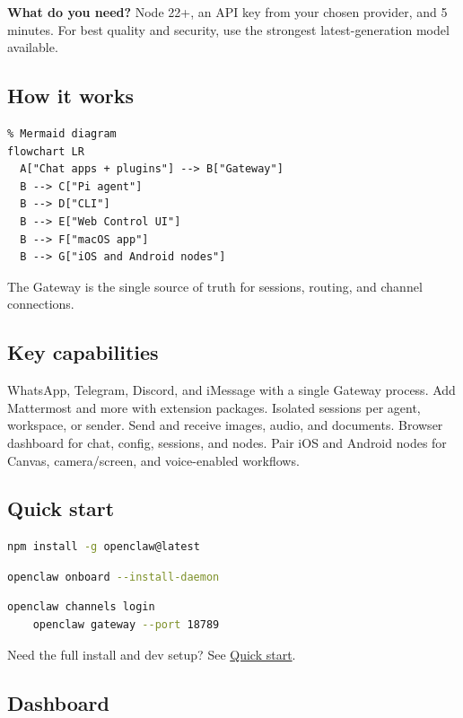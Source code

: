 \textbf{What do you need?} Node 22+, an API key from your chosen provider, and 5 minutes. For best quality and security, use the strongest latest-generation model available.

\subsection{How it works}


\begin{verbatim}
% Mermaid diagram
flowchart LR
  A["Chat apps + plugins"] --> B["Gateway"]
  B --> C["Pi agent"]
  B --> D["CLI"]
  B --> E["Web Control UI"]
  B --> F["macOS app"]
  B --> G["iOS and Android nodes"]
\end{verbatim}


The Gateway is the single source of truth for sessions, routing, and channel connections.

\subsection{Key capabilities}


WhatsApp, Telegram, Discord, and iMessage with a single Gateway process.
Add Mattermost and more with extension packages.
Isolated sessions per agent, workspace, or sender.
Send and receive images, audio, and documents.
Browser dashboard for chat, config, sessions, and nodes.
Pair iOS and Android nodes for Canvas, camera/screen, and voice-enabled workflows.

\subsection{Quick start}


\begin{lstlisting}[language=bash]
    npm install -g openclaw@latest
\end{lstlisting}

\begin{lstlisting}[language=bash]
    openclaw onboard --install-daemon
\end{lstlisting}

\begin{lstlisting}[language=bash]
    openclaw channels login
    openclaw gateway --port 18789
\end{lstlisting}


Need the full install and dev setup? See \href{/start/quickstart}{Quick start}.

\subsection{Dashboard}


